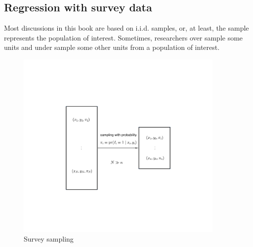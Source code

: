\subsection{Regression with survey data}
\label{sec::regression-surveydata}

Most discussions in this book are based on i.i.d. samples, or, at
least, the sample represents the population of interest. Sometimes, researchers over sample some units and under sample some other
units from a population of interest. 

\begin{figure}
\centering
\includegraphics[width = 0.9\textwidth]{figures/surveysamplingplot}
\caption{Survey sampling}
\end{figure}

